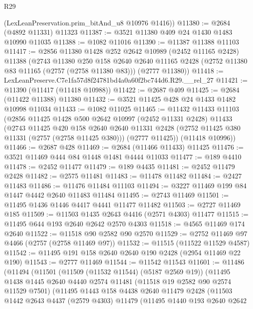 \begin{lexlean}{R29}
\begin{coremodule}
      (LexLeanPreservation.prim_bitAnd_u8 @10976 @1416))
@11380 := @2684 (@4892 @11331) @11323
@11387 := @3521 @11380 @409 @24 @1430 @1483 @10990 @11035
@11388 := @1082 @11016
@11390 := @11387 @11388 @11103
@11417 := @2856
    @11380
    @1428
    @252
    @2642
    @10989
    (@2452 @11165 @2428)
    @11388
    (@2743
      @11380
      @250
      @158
      @2640
      @2640
      @11165
      @2428
      (@2752 @11380 @83 @11165 (@2757 (@2758 @11380 @83)))
      (@2777 @11380))
@11418 := LexLeanPreserve.C7e1fa57d8f24781bd4a0a60f2bc744d6.R29.__rel_27
@11421 := @11390 (@11417 (@11418 @10988))
@11422 := @2687 @409
@11425 := @2684 (@11422 @11388) @11380
@11432 := @3521 @11425 @428 @24 @1433 @1482 @10998 @11034
@11433 := @1082 @11025
@11465 := @11432
    @11433
    @11103
    (@2856
      @11425
      @1428
      @500
      @2642
      @10997
      (@2452 @11331 @2428)
      @11433
      (@2743
        @11425
        @420
        @158
        @2640
        @2640
        @11331
        @2428
        (@2752 @11425 @380 @11331 (@2757 (@2758 @11425 @380)))
        (@2777 @11425))
      (@11418 @10996))
@11466 := @2687 @428
@11469 := @2684 (@11466 @11433) @11425
@11476 := @3521 @11469 @444 @84 @1448 @1481 @4444 @11033
@11477 := @189 @4410
@11478 := @2452 @11477
@11479 := @189 @4435
@11481 := @2452 @11479 @2428
@11482 := @2575 @11481
@11483 := @11478 @11482
@11484 := @2427 @11483
@11486 := @11476 @11484 @11103
@11494 := @3227 @11469 @199 @84 @1447 @4442 @2640 @11483 @11484
@11495 := @2743 @11469
@11501 := @11495 @1436 @1446 @4417 @4441 @11477 @11482
@11503 := @2727 @11469 @185
@11509 := @11503 @1435 @2643 @4416 (@2571 @4303) @11477
@11515 := @11495 @644 @193 @2640 @2642 @2570 @4303
@11518 := @4565 @11469 @174 @2640
@11522 := @11518 @90 @2582 @90 @2570
@11529 := @2752 @11469 @97 @4466 (@2757 (@2758 @11469 @97))
@11532 := @11515 (@11522 @11529 @4587)
@11542 := @11495 @191 @158 @2640 @2640 @190 @2428 (@2954 @11469 @22 @190)
@11543 := @2777 @11469
@11544 := @11542 @11543
@11601 := @11486
    (@11494
      (@11501
        (@11509 (@11532 @11544) (@5187 @2569 @19))
        (@11495
          @1438
          @1445
          @2640
          @4440
          @2574
          @11481
          (@11518 @19 @2582 @90 @2574 @11529 @7501)
          (@11495
            @1443
            @158
            @4438
            @2640
            @11479
            @2428
            (@11503
              @1442
              @2643
              @4437
              (@2579 @4303)
              @11479
              (@11495
                @1440
                @193
                @2640
                @2642

\end{coremodule}
\end{lexlean}
